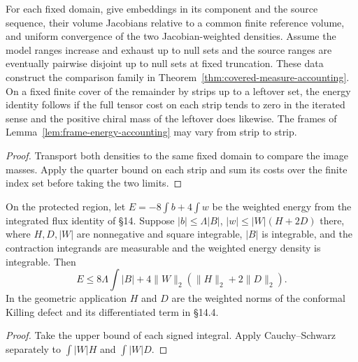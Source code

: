 \begin{proposition}
\label{prop:accounting-on-embeddings}
\leanok
For each fixed domain, give embeddings in its component and the
source sequence, their volume Jacobians relative to a common finite
reference volume, and uniform convergence of the two Jacobian-weighted
densities. Assume the model ranges increase and exhaust up to null
sets and the source ranges are eventually pairwise disjoint up to
null sets at fixed truncation. These data construct the comparison
family in Theorem~\ref{thm:covered-measure-accounting}.
On a fixed finite cover of the remainder by strips up to a leftover
set, the energy identity follows if the full tensor cost on each
strip tends to zero in the iterated sense and the positive chiral mass
of the leftover does likewise. The frames of
Lemma~\ref{lem:frame-energy-accounting} may vary from strip to strip.
\end{proposition}
\begin{proof}
\leanok
Transport both densities to the same fixed domain to compare the image
masses. Apply the quarter bound on each strip and sum its costs over
the finite index set before taking the two limits.
\end{proof}

\begin{lemma}
\label{lem:integral-intrinsic-flux}
\leanok
On the protected region, let $E=-8\int b+4\int w$ be the weighted
energy from the integrated flux identity of \S14. Suppose
$|b|\le\Lambda |B|$, $|w|\le |W|(H+2D)$ there, where $H,D,|W|$
are nonnegative and square integrable, $|B|$ is integrable, and
the contraction integrands are measurable and the weighted energy density is integrable. Then
\[
 E\le8\Lambda\int |B|+4\|W\|_2(\|H\|_2+2\|D\|_2).
\]
In the geometric application $H$ and $D$ are the weighted norms of the
conformal Killing defect and its differentiated term in \S14.4.
\end{lemma}
\begin{proof}
\leanok
Take the upper bound of each signed integral. Apply
Cauchy--Schwarz separately to $\int |W|H$ and $\int |W|D$.
\end{proof}

